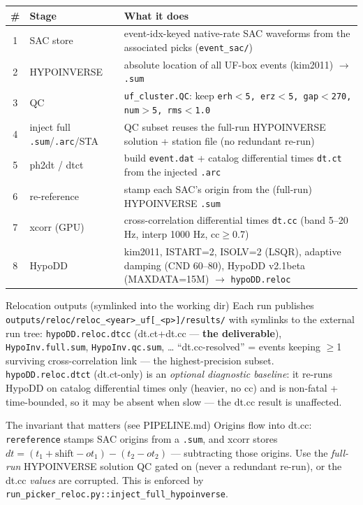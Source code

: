 \documentclass[11pt]{article}
\newcommand{\code}[1]{\texttt{#1}}
\begin{document}
\begin{center}
\small
\begin{tabular}{@{}c>{\raggedright\arraybackslash}p{3.0cm}>{\raggedright\arraybackslash}p{9.2cm}@{}}
\toprule
\# & Stage & What it does \\
\midrule
1 & SAC store & event-idx-keyed native-rate SAC waveforms from the associated picks (\code{event\_sac/}) \\
2 & HYPOINVERSE & absolute location of all UF-box events (kim2011) $\rightarrow$ \code{.sum} \\
3 & QC & \code{uf\_cluster.QC}: keep \code{erh$<$5, erz$<$5, gap$<$270, num$>$5, rms$<$1.0} \\
4 & inject full \code{.sum}/\code{.arc}/STA & QC subset reuses the full-run HYPOINVERSE solution + station file (no redundant re-run) \\
5 & ph2dt / dtct & build \code{event.dat} + catalog differential times \code{dt.ct} from the injected \code{.arc} \\
6 & re-reference & stamp each SAC's origin from the (full-run) HYPOINVERSE \code{.sum} \\
7 & xcorr (GPU) & cross-correlation differential times \code{dt.cc} (band 5--20 Hz, interp 1000 Hz, cc$\ge$0.7) \\
8 & HypoDD & kim2011, ISTART=2, ISOLV=2 (LSQR), adaptive damping (CND 60--80), HypoDD v2.1beta (MAXDATA=15M) $\rightarrow$ \code{hypoDD.reloc} \\
\bottomrule
\end{tabular}
\end{center}

\begin{keybox}{Relocation outputs (symlinked into the working dir)}
Each run publishes \code{outputs/reloc/reloc\_<year>\_uf[\_<p>]/results/} with symlinks to the external run tree:
\code{hypoDD.reloc.dtcc} (dt.ct+dt.cc — \textbf{the deliverable}), \code{HypoInv.full.sum}, \code{HypoInv.qc.sum}, \dots
``dt.cc-resolved'' = events keeping $\ge$1 surviving cross-correlation link — the highest-precision subset.
\code{hypoDD.reloc.dtct} (dt.ct-only) is an \emph{optional diagnostic baseline}: it re-runs HypoDD on catalog
differential times only (heavier, no cc) and is non-fatal + time-bounded, so it may be absent when slow — the
dt.cc result is unaffected.
\end{keybox}

\begin{warnbox}{The invariant that matters (see PIPELINE.md)}
Origins flow into dt.cc: \code{rereference} stamps SAC origins from a \code{.sum}, and xcorr stores
$dt=(t_1{+}\text{shift}{-}ot_1)-(t_2{-}ot_2)$ — subtracting those origins. Use the \emph{full-run} HYPOINVERSE
solution QC gated on (never a redundant re-run), or the dt.cc \emph{values} are corrupted. This is enforced by
\code{run\_picker\_reloc.py::inject\_full\_hypoinverse}.
\end{warnbox}
\end{document}
